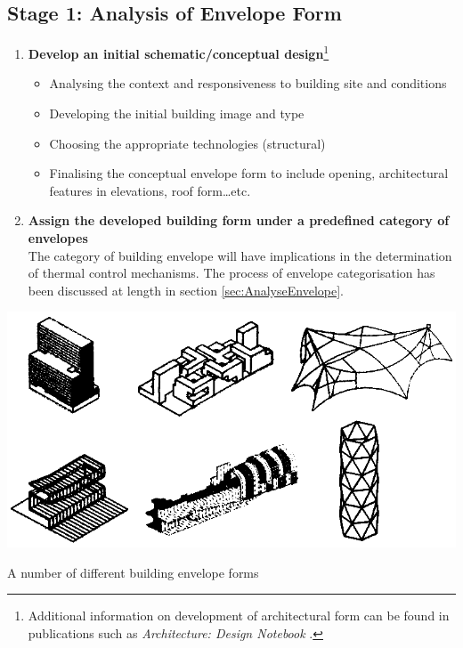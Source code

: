 \clearpage
\colorbox{95Gray}{%
	\begin{minipage}[c][20.5cm][t]{\textwidth}{%
		\subsection{Stage 1: Analysis of Envelope Form}
		\label{sec:Stage1}
		\vspace{0.5cm}
		\begin{enumerate}
			\item \textbf{Develop an initial schematic/conceptual design}\footnote{Additional information on development of architectural form can be found in publications such as \emph{Architecture: Design Notebook} \cite{fawcett03}.}
				\begin{itemize}
					\item Analysing the context and responsiveness to building site and conditions
					\item Developing the initial building image and type
					\item Choosing the appropriate technologies (structural)
					\item Finalising the conceptual envelope form to include opening, architectural features in elevations, roof form\ldots etc.
				\end{itemize}
			\vspace{0.2cm}
			\item \textbf{Assign the developed building form under a predefined category of envelopes}\\[3mm]
				The category of building envelope will have implications in the determination of thermal control mechanisms. The process of envelope categorisation has been discussed at length in section \ref{sec:AnalyseEnvelope}.
		\end{enumerate}
		\includegraphics[width=\textwidth]{./Images/23-StageA}
		\begin{center}
		\small A number of different building envelope forms
		\end{center}
	}%
\end{minipage}%
}

